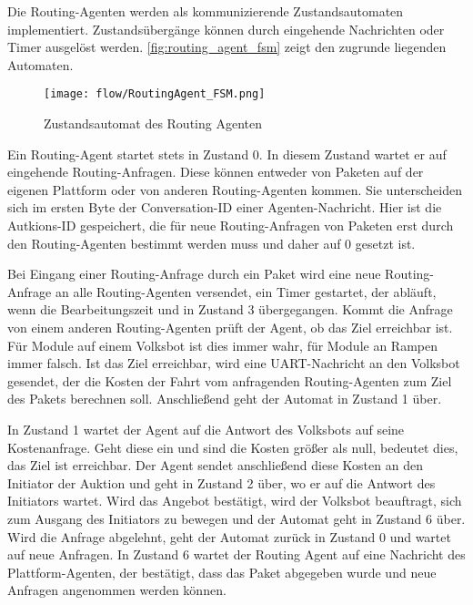 Die Routing-Agenten werden als kommunizierende Zustandsautomaten implementiert. Zustandsübergänge können durch eingehende Nachrichten oder Timer ausgelöst werden. \autoref{fig:routing_agent_fsm} zeigt den zugrunde liegenden Automaten.

\begin{figure}[h!]
  \centering
    \texttt{[image: flow/RoutingAgent\_FSM.png]}
    \caption{Zustandsautomat des Routing Agenten}
    \label{fig:routing_agent_fsm}
\end{figure}

Ein Routing-Agent startet stets in Zustand 0. In diesem Zustand wartet er auf eingehende Routing-Anfragen. Diese können entweder von Paketen auf der eigenen Plattform oder von anderen Routing-Agenten kommen. Sie unterscheiden sich im ersten Byte der Conversation-ID einer Agenten-Nachricht. Hier ist die Autkions-ID gespeichert, die für neue Routing-Anfragen von Paketen erst durch den Routing-Agenten bestimmt werden muss und daher auf 0 gesetzt ist. 

Bei Eingang einer Routing-Anfrage durch ein Paket wird eine neue Routing-Anfrage an alle Routing-Agenten versendet, ein Timer gestartet, der abläuft, wenn die Bearbeitungszeit  und in Zustand 3 übergegangen. Kommt die Anfrage von einem anderen Routing-Agenten prüft der Agent, ob das Ziel erreichbar ist. Für Module auf einem Volksbot ist dies immer wahr, für Module an Rampen immer falsch. Ist das Ziel erreichbar, wird eine UART-Nachricht an den Volksbot gesendet, der die Kosten der Fahrt vom anfragenden Routing-Agenten zum Ziel des Pakets berechnen soll. Anschließend geht der Automat in Zustand 1 über.

In Zustand 1 wartet der Agent auf die Antwort des Volksbots auf seine Kostenanfrage. Geht diese ein und sind die Kosten größer als null, bedeutet dies, das Ziel ist erreichbar. Der Agent sendet anschließend diese Kosten an den Initiator der Auktion und geht in Zustand 2 über, wo er auf die Antwort des Initiators wartet. Wird das Angebot bestätigt, wird der Volksbot beauftragt, sich zum Ausgang des Initiators zu bewegen und der Automat geht in Zustand 6 über. Wird die Anfrage abgelehnt, geht der Automat zurück in Zustand 0 und wartet auf neue Anfragen. In Zustand 6 wartet der Routing Agent auf eine Nachricht des Plattform-Agenten, der bestätigt, dass das Paket abgegeben wurde und neue Anfragen angenommen werden können.

